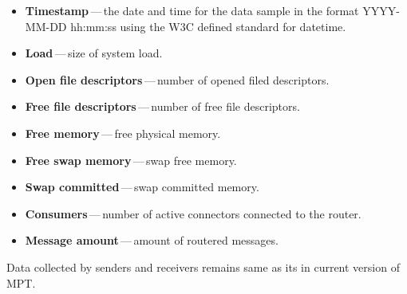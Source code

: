 \begin{itemize}
	\setlength\itemsep{0em}
	\item \textbf{Timestamp}\,---\,the date and time for the data sample in the format YYYY-MM-DD hh:mm:ss using the W3C defined standard for datetime.
	\item \textbf{Load}\,---\,size of system load.
	\item \textbf{Open file descriptors}\,---\,number of opened filed descriptors.
	\item \textbf{Free file descriptors}\,---\,number of free file descriptors.
	\item \textbf{Free memory}\,---\,free physical memory.
	\item \textbf{Free swap memory}\,---\,swap free memory.
	\item \textbf{Swap committed}\,---\,swap committed memory.
	\item \textbf{Consumers}\,---\,number of active connectors connected to the router.
	\item \textbf{Message amount}\,---\,amount of routered messages.
\end{itemize}
Data collected by senders and receivers remains same as its in current version of MPT.
